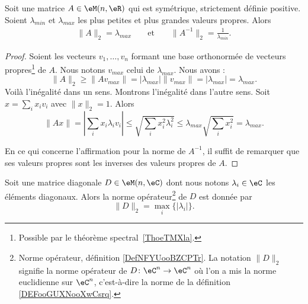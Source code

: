 \begin{lemma}       \label{LEMooNESTooVvUEOv}
	Soit une matrice \( A\in \eM(n,\eR)\) qui est symétrique, strictement définie positive. Soient \( \lambda_{min}\) et \( \lambda_{max}\) les plus petites et plus grandes valeurs propres. Alors
	\begin{subequations}
		\begin{align}
			\| A \|_2=\lambda_{max} &  & \text{ et } &  & \|A^{-1}  \|_2=\frac{1}{ \lambda_{min} }.
		\end{align}
	\end{subequations}
\end{lemma}

\begin{proof}
	Soient les vecteurs \( v_1,\ldots, v_n\) formant une base orthonormée de vecteurs propres\footnote{Possible par le théorème spectral~\ref{ThoeTMXla}.} de \( A\). Nous notons \( v_{max}\) celui de \( \lambda_{max}\). Nous avons :
	\begin{equation}
		\| A \|_2\geq \| Av_{max} \|=| \lambda_{max} |\| v_{max} \|=| \lambda_{max} |=\lambda_{max}.
	\end{equation}
	Voilà l'inégalité dans un sens. Montrons l'inégalité dans l'autre sens. Soit \( x=\sum_ix_iv_i\) avec \( \| x \|_2=1\). Alors
	\begin{equation}
		\| Ax \|=\left| \sum_ix_i\lambda_iv_i \right|\leq\sqrt{ \sum_ix_i^2\lambda_i^2 }\leq \lambda_{max}\sqrt{ \sum_ix_i^2}=\lambda_{max}.
	\end{equation}

	En ce qui concerne l'affirmation pour la norme de \( A^{-1}\), il suffit de remarquer que ses valeurs propres sont les inverses des valeurs propres de \( A\).
\end{proof}

\begin{lemma}        \label{LEMooCSBVooZzqxqg}
	Soit une matrice diagonale \( D\in \eM(n,\eC)\) dont nous notons \( \lambda_i\in \eC\) les éléments diagonaux. Alors la norme opérateur\footnote{Norme opérateur, définition \ref{DefNFYUooBZCPTr}. La notation \( \| D \|_2\) signifie la norme opérateur de \( D\colon \eC^n\to \eC^n\) où l'on a mis la norme euclidienne sur \( \eC^n\), c'est-à-dire la norme de la définition \ref{DEFooGUXNooXwCsrq}.} de \( D\) est donnée par
	\begin{equation}
		\| D \|_2=\max_i\{ | \lambda_i | \}.
	\end{equation}
\end{lemma}

